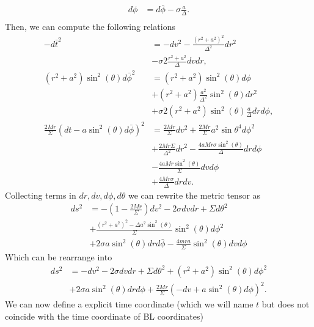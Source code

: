 \begin{Proof}
\begin{align}
 d\phi&=d\bar{\phi}- \sigma \frac{a}{\Delta}. \label{eq:Kerrcoordtrans2}\\
\end{align}
Then, we can compute the following relations
\begin{align}
 -d\bar{t}^2&=-dv^2-\frac{(r^2+a^2)^2}{\Delta^2} dr^2 \nonumber\\
 &-\sigma 2 \frac{r^2+a^2}{\Delta} dv dr,\\
 (r^2+a^2) \sin^2{(\theta)} d\bar{\phi}^2&=(r^2+a^2)\sin^2{(\theta)} d\phi \nonumber\\
 &+(r^2+a^2)\frac{a^2}{\Delta^2} \sin^2{(\theta)} dr^2 \nonumber\\
 &+ \sigma 2(r^2+a^2)\sin^2{(\theta)}\frac{a}{\Delta}  dr d\phi,\\
 \frac{2M r}{\Sigma}(dt-a \sin^2{(\theta)} d\bar\phi)^2&= \frac{2M r}{\Sigma} dv^2 +\frac{2M r}{\Sigma} a^2 \sin{\theta}^4 d\phi^2 \nonumber\\
 &+ \frac{2M r \Sigma}{\Delta^2} dr^2 -\frac{4 a  M r \sigma  \sin ^2(\theta )}{\Delta } dr d\phi \nonumber\\
 &-\frac{4 a  M r \sin ^2(\theta )}{\Sigma } dv d\phi\nonumber\\
 &+\frac{4  M r \sigma }{\Delta } dr dv.
\end{align}
Collecting terms in $dr,dv,d\phi,d\theta$ we  can rewrite the metric tensor as
\begin{equation}
 \begin{aligned}
ds^2&=-\left( 1- \frac{2 M r}{\Sigma} \right) dv^2- 2\sigma dvdr+\Sigma d\theta^2\\
&+\frac{(r^2+a^2)^2-\Delta a^2 \sin^2{(\theta)}}{\Sigma}\sin^2{(\theta)} d\phi^2\\
&+2 \sigma a \sin^2{(\theta)}  dr d\bar\phi-\frac{4 m r a}{\Sigma} \sin^2{(\theta)} dv d\phi
 \end{aligned}
\end{equation}
Which can be rearrange into
\begin{equation}
\begin{aligned}
ds^2&=-dv^2-2 \sigma dv dr +\Sigma d\theta^2+(r^2+a^2) \sin^2{(\theta)} d\phi^2 \\
&+ 2 \sigma a \sin^2{(\theta)} dr d\phi + \frac{2 M r}{\Sigma} (-dv +a \sin^2{(\theta)} d\phi)^2.
\end{aligned}
\end{equation}
We can now define a explicit time coordinate (which we will name $t$ but does not coincide with the time coordinate of \gls{BL} coordinates)
\begin{equation}\label{eq:timeeq2}

\end{equation}
\end{Proof}
